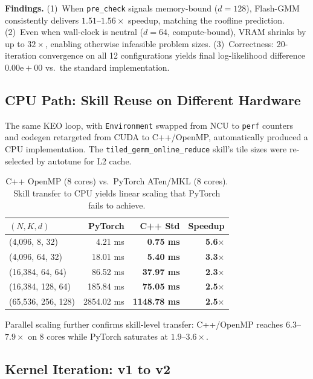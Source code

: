 \documentclass[sigconf,nonacm]{acmart}
\begin{document}
\textbf{Findings.} (1)~When \texttt{pre\_check} signals memory-bound
($d{=}128$), Flash-GMM consistently delivers $1.51$--$1.56\times$
speedup, matching the roofline prediction.
(2)~Even when wall-clock is neutral ($d{=}64$, compute-bound), VRAM
shrinks by up to $32\times$, enabling otherwise infeasible problem sizes.
(3)~Correctness: 20-iteration convergence on all 12 configurations
yields final log-likelihood difference $0.00\mathrm{e}{+}00$ vs.\ the
standard implementation.

\subsection{CPU Path: Skill Reuse on Different Hardware}

The same KEO loop, with \texttt{Environment} swapped from NCU to
\texttt{perf} counters and codegen retargeted from CUDA to
C++/OpenMP, automatically produced a CPU implementation. The
\texttt{tiled\_gemm\_online\_reduce} skill's tile sizes were
re-selected by autotune for L2 cache.

\begin{table}[h]
\centering
\caption{C++ OpenMP (8 cores) vs.\ PyTorch ATen/MKL (8 cores). Skill
transfer to CPU yields linear scaling that PyTorch fails to achieve.}
\label{tab:gmm-cpu}
\setlength{\tabcolsep}{4pt}
\small
\begin{tabular}{lrrr}
\toprule
$(N, K, d)$ & PyTorch & C++ Std & Speedup \\
\midrule
(4{,}096, 8, 32)     & 4.21 ms     & \textbf{0.75 ms}    & \textbf{5.6$\times$} \\
(4{,}096, 64, 32)    & 18.01 ms    & \textbf{5.40 ms}    & \textbf{3.3$\times$} \\
(16{,}384, 64, 64)   & 86.52 ms    & \textbf{37.97 ms}   & \textbf{2.3$\times$} \\
(16{,}384, 128, 64)  & 185.84 ms   & \textbf{75.05 ms}   & \textbf{2.5$\times$} \\
(65{,}536, 256, 128) & 2854.02 ms  & \textbf{1148.78 ms} & \textbf{2.5$\times$} \\
\bottomrule
\end{tabular}
\end{table}

Parallel scaling further confirms skill-level transfer: C++/OpenMP
reaches $6.3$--$7.9\times$ on 8 cores while PyTorch saturates at
$1.9$--$3.6\times$.

\subsection{Kernel Iteration: v1 to v2}
\end{document}
